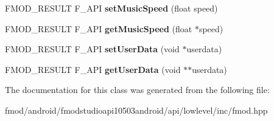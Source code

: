 \begin{DoxyCompactItemize}
\item 
\hypertarget{class_f_m_o_d_1_1_sound_af5fe3deac71212ab13531a7bec20c918}{F\+M\+O\+D\+\_\+\+R\+E\+S\+U\+L\+T F\+\_\+\+A\+P\+I {\bfseries set\+Music\+Speed} (float speed)}\label{class_f_m_o_d_1_1_sound_af5fe3deac71212ab13531a7bec20c918}

\item 
\hypertarget{class_f_m_o_d_1_1_sound_a22e4865bfd9f4bf40633671439dade82}{F\+M\+O\+D\+\_\+\+R\+E\+S\+U\+L\+T F\+\_\+\+A\+P\+I {\bfseries get\+Music\+Speed} (float $\ast$speed)}\label{class_f_m_o_d_1_1_sound_a22e4865bfd9f4bf40633671439dade82}

\item 
\hypertarget{class_f_m_o_d_1_1_sound_ac921f8c260ef5b396a837016d5882713}{F\+M\+O\+D\+\_\+\+R\+E\+S\+U\+L\+T F\+\_\+\+A\+P\+I {\bfseries set\+User\+Data} (void $\ast$userdata)}\label{class_f_m_o_d_1_1_sound_ac921f8c260ef5b396a837016d5882713}

\item 
\hypertarget{class_f_m_o_d_1_1_sound_a829f8e68b254764374c38e6e23f7f8df}{F\+M\+O\+D\+\_\+\+R\+E\+S\+U\+L\+T F\+\_\+\+A\+P\+I {\bfseries get\+User\+Data} (void $\ast$$\ast$userdata)}\label{class_f_m_o_d_1_1_sound_a829f8e68b254764374c38e6e23f7f8df}

\end{DoxyCompactItemize}


The documentation for this class was generated from the following file\+:\begin{DoxyCompactItemize}
\item 
fmod/android/fmodstudioapi10503android/api/lowlevel/inc/fmod.\+hpp\end{DoxyCompactItemize}
